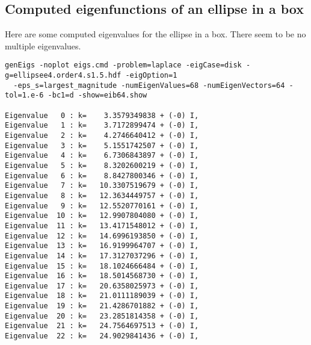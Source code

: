 \clearpage
\subsection{Computed eigenfunctions of an ellipse in a box}

Here are some computed eigenvalues for the ellipse in a box. There seem to be no multiple eigenvalues.
\begin{Verbatim}[fontsize=\footnotesize]
genEigs -noplot eigs.cmd -problem=laplace -eigCase=disk -g=ellipsee4.order4.s1.5.hdf -eigOption=1 
  -eps_s=largest_magnitude -numEigenValues=68 -numEigenVectors=64 -tol=1.e-6 -bc1=d -show=eib64.show

Eigenvalue   0 : k=    3.3579349838 + (-0) I,  
Eigenvalue   1 : k=    3.7172899474 + (-0) I,  
Eigenvalue   2 : k=    4.2746640412 + (-0) I,  
Eigenvalue   3 : k=    5.1551742507 + (-0) I,  
Eigenvalue   4 : k=    6.7306843897 + (-0) I,  
Eigenvalue   5 : k=    8.3202600219 + (-0) I,  
Eigenvalue   6 : k=    8.8427800346 + (-0) I,  
Eigenvalue   7 : k=   10.3307519679 + (-0) I,  
Eigenvalue   8 : k=   12.3634449757 + (-0) I,  
Eigenvalue   9 : k=   12.5520770161 + (-0) I,  
Eigenvalue  10 : k=   12.9907804080 + (-0) I,  
Eigenvalue  11 : k=   13.4171548012 + (-0) I,  
Eigenvalue  12 : k=   14.6996193850 + (-0) I,  
Eigenvalue  13 : k=   16.9199964707 + (-0) I,  
Eigenvalue  14 : k=   17.3127037296 + (-0) I,  
Eigenvalue  15 : k=   18.1024666484 + (-0) I,  
Eigenvalue  16 : k=   18.5014568730 + (-0) I,  
Eigenvalue  17 : k=   20.6358025973 + (-0) I,  
Eigenvalue  18 : k=   21.0111189039 + (-0) I,  
Eigenvalue  19 : k=   21.4286701882 + (-0) I,  
Eigenvalue  20 : k=   23.2851814358 + (-0) I,  
Eigenvalue  21 : k=   24.7564697513 + (-0) I,  
Eigenvalue  22 : k=   24.9029841436 + (-0) I,  

\end{Verbatim}


